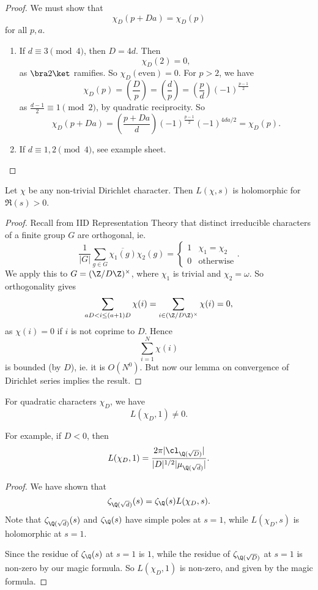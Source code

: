 \documentclass[a4paper]{article}
\begin{document}
\begin{proof}
  We must show that
  \[
    \chi_D(p + Da) = \chi_D(p)
  \]
  for all $p, a$.
  \begin{enumerate}
    \item If $d \equiv 3 \pmod 4$, then $D = 4d$. Then
      \[
        \chi_D(2) = 0,
      \]
      as $\bra 2\ket$ ramifies. So $\chi_D(\text{even}) = 0$. For $p > 2$, we have
      \[
        \chi_D(p) = \left(\frac{D}{p}\right) = \left(\frac{d}{p}\right) = \left(\frac{p}{d}\right) (-1)^{\frac{p - 1}{2}}
      \]
      as $\frac{d - 1}{2} \equiv 1 \pmod 2$, by quadratic reciprocity. So
      \[
        \chi_D(p + Da) = \left(\frac{p + Da}{d}\right) (-1)^{\frac{p - 1}{2}} (-1)^{4da/2} = \chi_D(p).
      \]
    \item If $d \equiv 1, 2\pmod 4$, see example sheet.
  \end{enumerate}
\end{proof}

\begin{lemma}
  Let $\chi$ be any non-trivial Dirichlet character. Then $L(\chi, s)$ is holomorphic for $\Re(s) > 0$.
\end{lemma}

\begin{proof}
  Recall from IID Representation Theory that distinct irreducible characters of a finite group $G$ are orthogonal, ie.
  \[
    \frac{1}{|G|} \sum_{g \in G} \overline{\chi_1(g)} \chi_2(g) =
    \begin{cases}
      1 & \chi_1 = \chi_2\\
      0 & \text{otherwise}
    \end{cases}.
  \]
  We apply this to $G = (\Z/D\Z)^{\times}$, where $\chi_1$ is trivial and $\chi_2 = \omega$. So orthogonality gives
  \[
    \sum_{aD < i \leq (a + 1)D} \chi(i) = \sum_{i \in (\Z/D\Z)^\times} \chi(i) = 0,
  \]
  as $\chi(i) = 0$ if $i$ is not coprime to $D$. Hence
  \[
    \sum_{i = 1}^N \chi(i)
  \]
  is bounded (by $D$), ie. it is $O(N^0)$. But now our lemma on convergence of Dirichlet series implies the result.
\end{proof}

\begin{cor}
  For quadratic characters $\chi_D$, we have
  \[
    L(\chi_D, 1) \not= 0.
  \]
\end{cor}
For example, if $D < 0$, then
\[
  L(\chi_D, 1) = \frac{2 \pi |\cl_{\Q(\sqrt{D})}|}{|D|^{1/2} |\mu_{\Q(\sqrt{d})}|}.
\]
\begin{proof}
  We have shown that
  \[
    \zeta_{\Q(\sqrt{d})}(s) = \zeta_{\Q}(s) L(\chi_D, s).
  \]
  Note that $\zeta_{\Q(\sqrt{d})}(s)$ and $\zeta_{\Q}(s)$ have simple poles at $s = 1$, while $L(\chi_D, s)$ is holomorphic at $s = 1$.

  Since the residue of $\zeta_{\Q}(s)$ at $s = 1$ is $1$, while the residue of $\zeta_{\Q(\sqrt{D})}$ at $s = 1$ is non-zero by our magic formula. So $L(\chi_D, 1)$ is non-zero, and given by the magic formula.
\end{proof}
\end{document}
